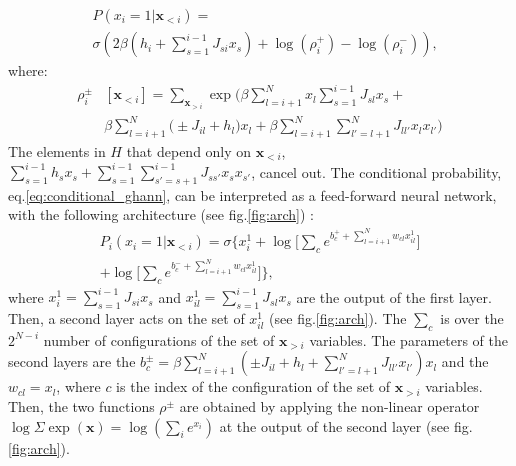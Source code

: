 \documentclass[aps,physrev,10pt,floatfix,reprint]{revtex4-2}
\begin{document}
\begin{equation}
    \label{eq:conditional_ghann}
    \begin{split}
    & P\left(x_{i}=1|\mathbf{x}_{<i}\right) = \\
    & \sigma\left( 2 \beta \left(h_i + \sum_{s=1}^{i-1} J_{si} x_s\right) +\log(\rho_i^+) - \log(\rho_i^-)
    \right),   
    \end{split}
\end{equation}
where:
\begin{equation}
    \begin{split}
    \rho_i^{\pm}&[\mathbf{x}_{<i}]  = \sum_{\mathbf{x}_{>i}}  \exp \bigg(
    \beta\sum_{l=i+1}^{N} x_l \sum_{s=1}^{i-1} J_{sl} x_s +\\
    &\beta\sum_{l=i+1}^{N}\big( \pm J_{il}  + h_l \big) x_l 
    + \beta\sum_{l=i+1}^{N}\sum_{l'=l+1}^{N} J_{ll'} x_l x_{l'} \bigg)
\end{split}
\label{eq:rho_ghann}
\end{equation}
The elements in $H$ that depend only on $\mathbf{x}_{<i}$, $\sum_{s=1}^{i-1} h_s x_s + \sum_{s=1}^{i-1}\sum_{s'=s+1}^{i-1} J_{ss'} x_{s} x_{s'}$, cancel out.
The conditional probability, eq.\ref{eq:conditional_ghann}, can be interpreted as a feed-forward neural network, with the following architecture (see fig.\ref{fig:arch}) :
\begin{multline}
        P_i\left(x_i=1 | \mathbf{x}_{<i}\right) = 
     \sigma \bigg\{ x_i^1+ 
     \log\big[ \sum_{c} e^{b_c^+ + \sum_{l=i+1}^{N} w_{cl} x_{il}^1}\big]\\
     +\log\big[ \sum_{c} e^{b_c^- + \sum_{l=i+1}^{N} w_{cl} x_{il}^1}\big] \bigg\},
\end{multline}
where $x_i^1=\sum_{s=1}^{i-1} J_{si} x_s$ and $x_{il}^1=\sum_{s=1}^{i-1} J_{sl} x_s$ are the output of the first layer. 
Then, a second layer acts on the set of $x_{il}^1$ (see fig.\ref{fig:arch}). The $\sum_{c}$ is over the $2^{N-i}$ number of configurations of the set of $\mathbf{x}_{>i}$ variables. 
The parameters of the second layers are the $b_c^{\pm} = \beta\sum_{l=i+1}^N (\pm J_{il} + h_l + \sum_{l'=l+1}^N J_{ll'}x_{l'}) x_l $ and the $w_{cl}=x_l$, where $c$ is the index of the configuration of the set of $\mathbf{x}_{>i}$ variables. Then, the two functions $\rho^{\pm}$ are obtained by applying the non-linear operator $\log \Sigma \exp (\mathbf{x}) = \log(\sum_i e^{x_i})$ at the output of the second layer (see fig.\ref{fig:arch}). 
\end{document}
